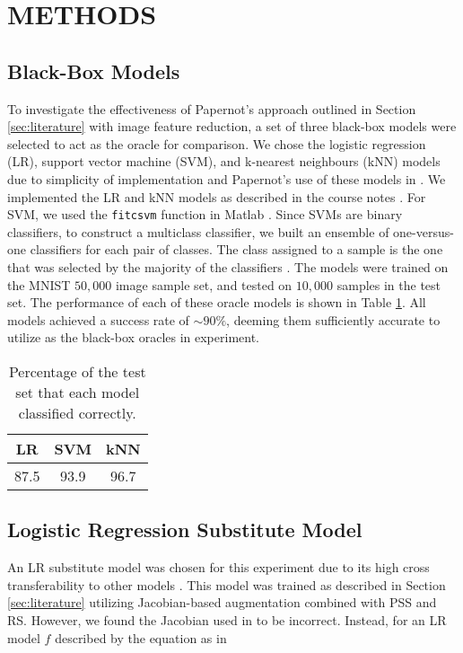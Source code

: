 \section{METHODS}

\subsection{Black-Box Models}

To investigate the effectiveness of Papernot's approach outlined in Section \ref{sec:literature} with image feature reduction, a set of three black-box models were selected to act as the oracle for comparison. We chose the logistic regression (LR), support vector machine (SVM), and k-nearest neighbours (kNN) models due to simplicity of implementation and Papernot's use of these models in \cite{papernot3}. We implemented the LR and kNN models as described in the course notes \cite{coursenotes}. For SVM, we used the \texttt{fitcsvm} function in Matlab \cite{matlab}. Since SVMs are binary classifiers, to construct a multiclass classifier, we built an ensemble of one-versus-one classifiers for each pair of classes. The class assigned to a sample is the one that was selected by the majority of the classifiers \cite{multiclasssvm}. The models were trained on the MNIST $50,000$ image sample set, and tested on $10,000$ samples in the test set. The performance of each of these oracle models is shown in Table \ref{tab:oracles}. All models achieved a success rate of $\sim 90 \%$, deeming them sufficiently accurate to utilize as the black-box oracles in experiment.

\begin{table}[h]
\begin{center}
\begin{tabular}{ccc}
\toprule
LR & SVM & kNN\\
\midrule \midrule
87.5 & 93.9 & 96.7 \\
\bottomrule
\end{tabular}
\end{center}
\caption{Percentage of the test set that each model classified correctly.}
\label{tab:oracles}
\end{table}

\subsection{Logistic Regression Substitute Model}

An LR substitute model was chosen for this experiment due to its high cross transferability to other models \cite{papernot3}. This model was trained as described in Section \ref{sec:literature} utilizing Jacobian-based augmentation combined with PSS and RS. However, we found the Jacobian used in \cite{papernot3} to be incorrect. Instead, for an LR model $f$ described by the equation as in \cite{papernot3}


